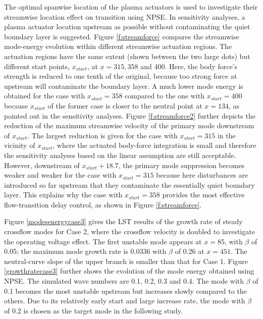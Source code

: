 The optimal spanwise location of the plasma actuators is used to investigate their streamwise location effect on transition using NPSE. In sensitivity analyses, a plasma actuator location upstream as possible without contaminating the quiet boundary layer is suggested. Figure \ref{f:streamforce} compares the streamwise mode-energy evolution within different streamwise actuation regions. The actuation regions have the same extent (shown between the two large dots) but different start points, $x_{start}$, at $x=315, 358$ and 400. Here, the body force's strength is reduced to one tenth of the original, because too strong force at upstream will contaminate the boundary layer. A much lower mode energy is obtained for the case with $x_{start}=358$ compared to the one with $x_{start}=400$ because $x_{start}$ of the former case is closer to the neutral point at $x=134$, as pointed out in the sensitivity analyses. Figure \ref{f:streamforce2} further depicts the reduction of the maximum streamwise velocity of the primary mode downstream of $x_{start}$. The largest reduction is given for the case with $x_{start}=315$ in the vicinity of $x_{start}$, where the actuated body-force integration is small and therefore the sensitivity analyses based on the linear assumption are still acceptable. However, downstream of $x_{start}+18.7$, the primary mode suppression becomes weaker and weaker for the case with $x_{start}=315$ because here disturbances are introduced so far upstream that they contaminate the essentially quiet boundary layer. This explains why the case with $x_{start}=358$ provides the most effective flow-transition delay control, as shown in Figure \ref{f:streamforce}. 

Figure \ref{modesenergycase3} gives the LST results of the growth rate of steady crossflow modes for Case 2, where the crossflow velocity is doubled to investigate the operating voltage effect. The first unstable mode appears at $x =85$, with $\beta$ of 0.05; the maximum mode growth rate is 0.0336 with $\beta$ of 0.26 at $x =451$. The neutral-curve slope of the upper branch is smaller than that for Case 1. Figure \ref{growthratecase3} further shows the evolution of the mode energy obtained using NPSE. The simulated wave numbers are 0.1, 0.2, 0.3 and 0.4. The mode with $\beta$ of 0.1 becomes the most unstable upstream but increases slowly compared to the others. Due to its relatively early start and large increase rate, the mode with $\beta$ of 0.2 is chosen as the target mode in the following study.


